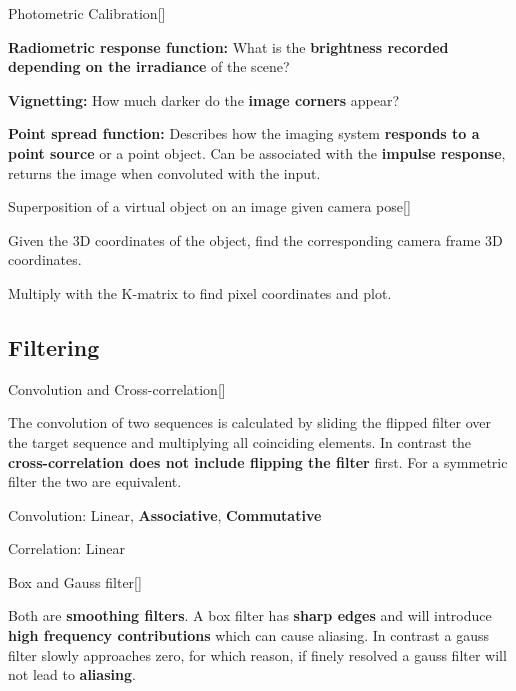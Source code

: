 \documentclass[10pt,a4paper]{scrartcl}
\begin{document}
\begin{multicols*}{2}
\begin{QandA}{Photometric Calibration}[\Definition]
\item \textbf{Radiometric response function:} What is the \textbf{brightness recorded depending on the irradiance} of the scene?
\item \textbf{Vignetting:} How much darker do the \textbf{image corners} appear?
\item \textbf{Point spread function:} Describes how the imaging system \textbf{responds to a point source} or a point object. Can be associated with the \textbf{impulse response}, returns the image when convoluted with the input.
\end{QandA}

\begin{QandA}{Superposition of a virtual object on an image given camera pose}[\Application]
\item Given the 3D coordinates of the object, find the corresponding camera frame 3D coordinates.
\item Multiply with the K-matrix to find pixel coordinates and plot.
\end{QandA}

\subsection*{Filtering}

\begin{QandA}{Convolution and Cross-correlation}[\Comparison]
\item The convolution of two sequences is calculated by sliding the flipped filter over the target sequence and multiplying all coinciding elements. In contrast the \textbf{cross-correlation does not include flipping the filter} first. For a symmetric filter the two are equivalent.
\item Convolution: Linear, \textbf{Associative}, \textbf{Commutative}
\item Correlation: Linear
\end{QandA}

\begin{QandA}{Box and Gauss filter}[\Comparison]
\item Both are \textbf{smoothing filters}. A box filter has \textbf{sharp edges} and will introduce \textbf{high frequency contributions} which can cause aliasing. In contrast a gauss filter slowly approaches zero, for which reason, if finely resolved a gauss filter will not lead to \textbf{aliasing}.
\end{QandA}


\end{multicols*}
\end{document}
